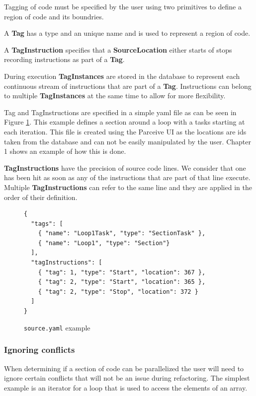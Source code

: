 Tagging of code must be specified by the user using two primitives to define a region of code and its boundries.

A \textbf{Tag} has a type and an unique name and is used to represent a region of code.

A \textbf{TagInstruction} specifies that a \textbf{SourceLocation} either starts of stops recording instructions as part of a \textbf{Tag}.

During execution \textbf{TagInstances} are stored in the database to represent each continuous stream of instructions that are part of a \textbf{Tag}. Instructions can belong to multiple \textbf{TagInstances} at the same time to allow for more flexibility.

Tag and TagInstructions are specified in a simple yaml file as can be seen in Figure \ref{cap3:source-example}. This example defines a section around a loop with a tasks starting at each iteration. This file is created using the Parceive UI as the locations are ids taken from the database and can not be easily manipulated by the user. Chapter 1 shows an example of how this is done.

\textbf{TagInstructions} have the precision of source code lines. We consider that one has been hit as soon as any of the instructions that are part of that line execute. Multiple \textbf{TagInstructions} can refer to the same line and they are applied in the order of their definition.

\begin{figure}
	\begin{center}
		\begin{verbatim}
{
  "tags": [
    { "name": "Loop1Task", "type": "SectionTask" },
    { "name": "Loop1", "type": "Section"}
  ],
  "tagInstructions": [
    { "tag": 1, "type": "Start", "location": 367 },
    { "tag": 2, "type": "Start", "location": 365 },
    { "tag": 2, "type": "Stop", "location": 372 }
  ]
}
		\end{verbatim}
	\end{center}
	\caption{\texttt{source.yaml} example}
	\label{cap3:source-example}
\end{figure}

\subsubsection{Ignoring conflicts}

When determining if a section of code can be parallelized the user will need to ignore certain conflicts that will not be an issue during refactoring. The simplest example is an iterator for a loop that is used to access the elements of an array.

